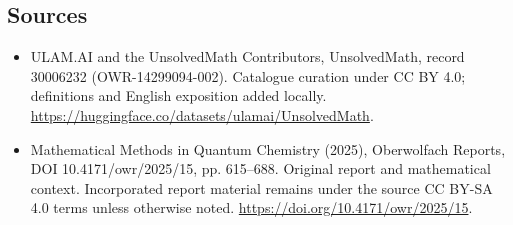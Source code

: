 \documentclass[11pt]{article}
\begin{document}
\subsection{Sources}
\begin{itemize}
\item[\hypertarget{source:30006232:1}{S1}] ULAM.AI and the UnsolvedMath Contributors, UnsolvedMath, record 30006232 (OWR-14299094-002). Catalogue curation under CC BY 4.0; definitions and English exposition added locally.
\url{https://huggingface.co/datasets/ulamai/UnsolvedMath}.
\item[\hypertarget{source:30006232:2}{S2}] Mathematical Methods in Quantum Chemistry (2025), Oberwolfach Reports, DOI 10.4171/owr/2025/15, pp. 615--688. Original report and mathematical context. Incorporated report material remains under the source CC BY-SA 4.0 terms unless otherwise noted.
\url{https://doi.org/10.4171/owr/2025/15}.
\end{itemize}
\label{end:30006232}
\end{document}
